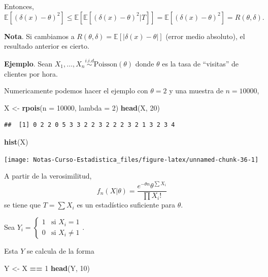 \documentclass[
  12pt,
]{book}
\newenvironment{Shaded}{\begin{snugshade}}{\end{snugshade}}
\newcommand{\DataTypeTok}[1]{\textcolor[rgb]{0.13,0.29,0.53}{#1}}
\newcommand{\DecValTok}[1]{\textcolor[rgb]{0.00,0.00,0.81}{#1}}
\newcommand{\KeywordTok}[1]{\textcolor[rgb]{0.13,0.29,0.53}{\textbf{#1}}}
\newcommand{\NormalTok}[1]{#1}
\newcommand{\OperatorTok}[1]{\textcolor[rgb]{0.81,0.36,0.00}{\textbf{#1}}}
\newcommand{\StringTok}[1]{\textcolor[rgb]{0.31,0.60,0.02}{#1}}
\begin{document}
Entonces,
\[ \mathbb E[(\delta(x)-\theta)^2] \leq \mathbb E[\mathbb E[(\delta(x)-\theta)^2|T]] = \mathbb E[(\delta(x)-\theta)^2] = R(\theta,\delta).\]

\textbf{Nota}. Si cambiamos a \(R(\theta,\delta) = \mathbb E[|\delta(x)-\theta|]\) (error medio absoluto), el resultado anterior es cierto.

\textbf{Ejemplo}. Sean \(X_1,\dots, X_n \stackrel{i.i.d}{\sim} \text{Poisson}(\theta)\) donde \(\theta\) es la tasa de ``visitas'' de clientes por hora.

Numericamente podemos hacer el ejemplo con \(\theta = 2\) y una muestra de \(n = 10000\),

\begin{Shaded}
\begin{Highlighting}[]
\NormalTok{X \textless{}{-}}\StringTok{ }\KeywordTok{rpois}\NormalTok{(}\DataTypeTok{n =} \DecValTok{10000}\NormalTok{, }\DataTypeTok{lambda =} \DecValTok{2}\NormalTok{)}
\KeywordTok{head}\NormalTok{(X, }\DecValTok{20}\NormalTok{)}
\end{Highlighting}
\end{Shaded}

\begin{verbatim}
##  [1] 0 2 2 0 5 3 3 2 2 3 2 2 2 3 2 1 3 2 3 4
\end{verbatim}

\begin{Shaded}
\begin{Highlighting}[]
\KeywordTok{hist}\NormalTok{(X)}
\end{Highlighting}
\end{Shaded}

\begin{center}\texttt{[image: Notas-Curso-Estadistica\_files/figure-latex/unnamed-chunk-36-1]} \end{center}

A partir de la verosimilitud,
\[f_n(X|\theta) = \dfrac{e^{-\theta n} \theta^{\sum X_i}}{\prod X_i!} \]
se tiene que \(T=\sum X_i\) es un estadístico suficiente para \(\theta\).

Sea \(Y_i = \begin{cases} 1 & \text{si } X_i = 1\\ 0 & \text{si } X_i \ne 1\end{cases}\).

Esta \(Y\) se calcula de la forma

\begin{Shaded}
\begin{Highlighting}[]
\NormalTok{Y \textless{}{-}}\StringTok{ }\NormalTok{X }\OperatorTok{==}\StringTok{ }\DecValTok{1}
\KeywordTok{head}\NormalTok{(Y, }\DecValTok{10}\NormalTok{)}
\end{Highlighting}
\end{Shaded}
\end{document}
